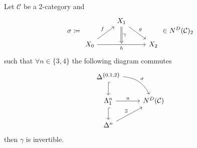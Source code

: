 \begin{prop}
	Let $ \mathcal{ C } $ be a 2-category and 
	\[
	\sigma \coloneqq
	\begin{tikzcd}
		& 
		X_1
		\ar[rd,"g"]
		\ar[d, Rightarrow, "\gamma"]
		\\
		X_0 
		\ar[ru, "f"]
		\ar[rr, "h"']
		&
		{}
		&
		X_2
	\end{tikzcd}
	\in N^D (\mathcal{ C } )_2
	\]
	such that $ \forall n \in \{ 3 , 4 \} $ the following diagram commutes
	\[
	\begin{tikzcd}
		\Delta^{ \{ 0 , 1 , 2 \} }
		\ar[d, hook]
		\ar[rd, bend left, "\sigma"]
		\\
		\Lambda_1^n
		\ar[r, "u"]
		\ar[d, hook]
		&
		N^D ( \mathcal{ C } )
		\\
		\Delta^n
		\ar[ru, "\exists"]
	\end{tikzcd}
	\]
	then $ \gamma $ is invertible.
\end{prop}

